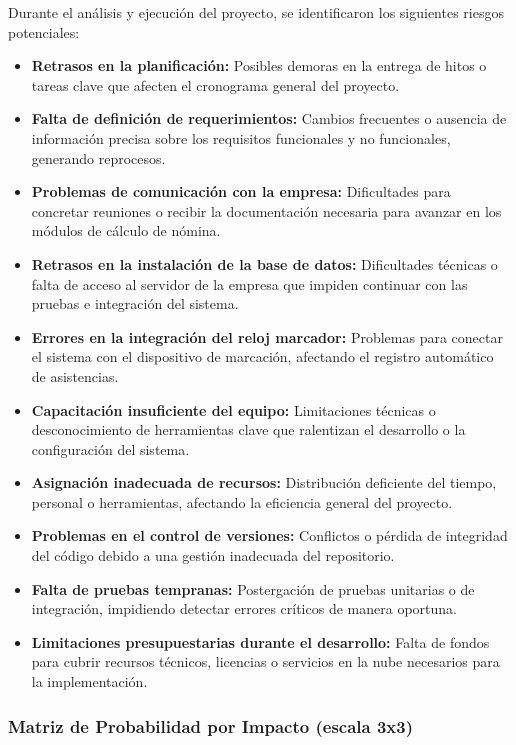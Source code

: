 Durante el análisis y ejecución del proyecto, se identificaron los siguientes riesgos potenciales:

\begin{itemize}
	\item \textbf{Retrasos en la planificación:} Posibles demoras en la entrega de hitos o tareas clave que afecten el cronograma general del proyecto.
	\item \textbf{Falta de definición de requerimientos:} Cambios frecuentes o ausencia de información precisa sobre los requisitos funcionales y no funcionales, generando reprocesos.
	\item \textbf{Problemas de comunicación con la empresa:} Dificultades para concretar reuniones o recibir la documentación necesaria para avanzar en los módulos de cálculo de nómina.
	\item \textbf{Retrasos en la instalación de la base de datos:} Dificultades técnicas o falta de acceso al servidor de la empresa que impiden continuar con las pruebas e integración del sistema.
	\item \textbf{Errores en la integración del reloj marcador:} Problemas para conectar el sistema con el dispositivo de marcación, afectando el registro automático de asistencias.
	\item \textbf{Capacitación insuficiente del equipo:} Limitaciones técnicas o desconocimiento de herramientas clave que ralentizan el desarrollo o la configuración del sistema.
	\item \textbf{Asignación inadecuada de recursos:} Distribución deficiente del tiempo, personal o herramientas, afectando la eficiencia general del proyecto.
	\item \textbf{Problemas en el control de versiones:} Conflictos o pérdida de integridad del código debido a una gestión inadecuada del repositorio.
	\item \textbf{Falta de pruebas tempranas:} Postergación de pruebas unitarias o de integración, impidiendo detectar errores críticos de manera oportuna.
	\item \textbf{Limitaciones presupuestarias durante el desarrollo:} Falta de fondos para cubrir recursos técnicos, licencias o servicios en la nube necesarios para la implementación.
\end{itemize}

\subsubsection*{Matriz de Probabilidad por Impacto (escala 3x3)}

